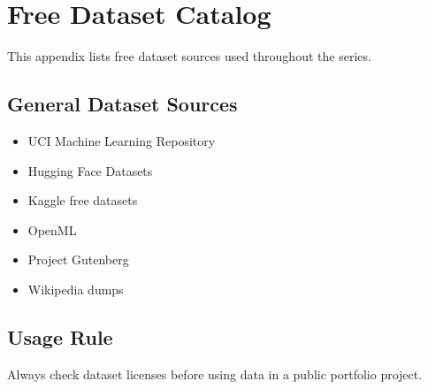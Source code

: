 \chapter{Free Dataset Catalog}
\label{app:datasets}
This appendix lists free dataset sources used throughout the series.
\section{General Dataset Sources}\begin{itemize}\item UCI Machine Learning Repository\item Hugging Face Datasets\item Kaggle free datasets\item OpenML\item Project Gutenberg\item Wikipedia dumps\end{itemize}
\section{Usage Rule}Always check dataset licenses before using data in a public portfolio project.
